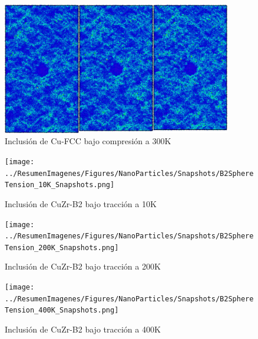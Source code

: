 \begin{figure}[htp]
\centering
\includegraphics[width=10cm]{../ResumenImagenes/Figures/NanoParticles/Snapshots/cuSphereCompression_300K_Snapshots.png}
\caption[Inclusión de Cu-FCC bajo compresión a 300K]{Inclusión de Cu-FCC bajo compresión a 300K}
\label{C4:fg:snapshot_comp_FCC_300K}
\end{figure}

\begin{figure}[htp]
\centering
\texttt{[image: ../ResumenImagenes/Figures/NanoParticles/Snapshots/B2SphereTension\_10K\_Snapshots.png]}
\caption[Inclusión de CuZr-B2 bajo tracción a 10K]{Inclusión de CuZr-B2 bajo tracción a 10K}
\label{C4:fg:snapshot_ten_B2_10K}
\end{figure}

\begin{figure}[htp]
\centering
\texttt{[image: ../ResumenImagenes/Figures/NanoParticles/Snapshots/B2SphereTension\_200K\_Snapshots.png]}
\caption[Inclusión de CuZr-B2 bajo tracción a 200K]{Inclusión de CuZr-B2 bajo tracción a 200K}
\label{C4:fg:snapshot_ten_B2_200K}
\end{figure}


\clearpage

\begin{figure}[htp]
\centering
\texttt{[image: ../ResumenImagenes/Figures/NanoParticles/Snapshots/B2SphereTension\_400K\_Snapshots.png]}
\caption[Inclusión de CuZr-B2 bajo tracción a 400K]{Inclusión de CuZr-B2 bajo tracción a 400K}
\label{C4:fg:snapshot_ten_B2_400K}
\end{figure}

